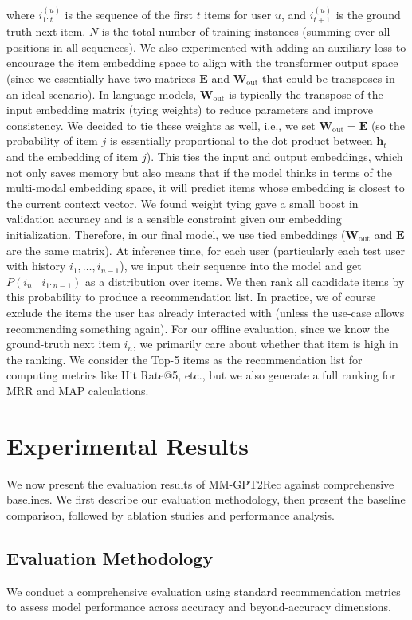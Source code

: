 \documentclass[conference]{IEEEtran}
\begin{document}
where $i_{1:t}^{(u)}$ is the sequence of the first $t$ items for user $u$, and $i_{t+1}^{(u)}$ is the ground truth next item. $N$ is the total number of training instances (summing over all positions in all sequences). We also experimented with adding an auxiliary loss to encourage the item embedding space to align with the transformer output space (since we essentially have two matrices $\mathbf{E}$ and $\mathbf{W}_{\text{out}}$ that could be transposes in an ideal scenario). In language models, $\mathbf{W}_{\text{out}}$ is typically the transpose of the input embedding matrix (tying weights) to reduce parameters and improve consistency. We decided to tie these weights as well, i.e., we set $\mathbf{W}_{\text{out}} = \mathbf{E}$ (so the probability of item $j$ is essentially proportional to the dot product between $\mathbf{h}_t$ and the embedding of item $j$). This ties the input and output embeddings, which not only saves memory but also means that if the model thinks in terms of the multi-modal embedding space, it will predict items whose embedding is closest to the current context vector. We found weight tying gave a small boost in validation accuracy and is a sensible constraint given our embedding initialization. Therefore, in our final model, we use tied embeddings ($\mathbf{W}_{\text{out}}$ and $\mathbf{E}$ are the same matrix). At inference time, for each user (particularly each test user with history $i_1,\ldots,i_{n-1}$), we input their sequence into the model and get $P(i_n \mid i_{1:n-1})$ as a distribution over items. We then rank all candidate items by this probability to produce a recommendation list. In practice, we of course exclude the items the user has already interacted with (unless the use-case allows recommending something again). For our offline evaluation, since we know the ground-truth next item $i_n$, we primarily care about whether that item is high in the ranking. We consider the Top-5 items as the recommendation list for computing metrics like Hit Rate@5, etc., but we also generate a full ranking for MRR and MAP calculations. 


\section{Experimental Results}
We now present the evaluation results of MM-GPT2Rec against comprehensive baselines. We first describe our evaluation methodology, then present the baseline comparison, followed by ablation studies and performance analysis.

\subsection{Evaluation Methodology}
We conduct a comprehensive evaluation using standard recommendation metrics to assess model performance across accuracy and beyond-accuracy dimensions.
\end{document}
